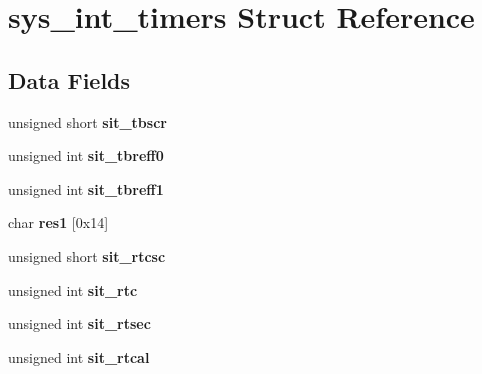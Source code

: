 \hypertarget{structsys__int__timers}{}\section{sys\+\_\+int\+\_\+timers Struct Reference}
\label{structsys__int__timers}
\subsection*{Data Fields}
\begin{DoxyCompactItemize}
\item 
\mbox{\label{structsys__int__timers_ac1f57d0e31ed29f3894645b08a5b0a6b}} 
unsigned short {\bfseries sit\+\_\+tbscr}
\item 
\mbox{\label{structsys__int__timers_a79412500df42a95158db7bcdcc24effc}} 
unsigned int {\bfseries sit\+\_\+tbreff0}
\item 
\mbox{\label{structsys__int__timers_a0a0e8a6a06e0818edc3b044081dc67b7}} 
unsigned int {\bfseries sit\+\_\+tbreff1}
\item 
\mbox{\label{structsys__int__timers_aafec24b092d7456870dc8f036ab428d6}} 
char {\bfseries res1} \mbox{[}0x14\mbox{]}
\item 
\mbox{\label{structsys__int__timers_a9f18efe12cf4a531d15b43b0e166218e}} 
unsigned short {\bfseries sit\+\_\+rtcsc}
\item 
\mbox{\label{structsys__int__timers_a53f779bf1a41a033735f11496ecccdb1}} 
unsigned int {\bfseries sit\+\_\+rtc}
\item 
\mbox{\label{structsys__int__timers_a7cf6a08cf7800a9569b726c4a35624fa}} 
unsigned int {\bfseries sit\+\_\+rtsec}
\item 
\mbox{\label{structsys__int__timers_aa1889cfbe91cee33c838ee26300f0409}} 
unsigned int {\bfseries sit\+\_\+rtcal}
\item 
\mbox{\label{structsys__int__timers_a283dced340f8a0b04a3ee3434620847e}} 

\end{DoxyCompactItemize}
